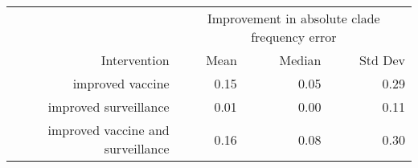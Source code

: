 
\begin{tabular*}{0.7\textwidth}{rrrr}
\toprule
             & \multicolumn{3}{c}{Improvement in absolute clade frequency error} \\
Intervention & Mean & Median & Std Dev \\
\midrule

improved vaccine & 0.15 & 0.05 & 0.29 \\
improved surveillance & 0.01 & 0.00 & 0.11 \\
improved vaccine and surveillance & 0.16 & 0.08 & 0.30 \\

\bottomrule
\end{tabular*}

